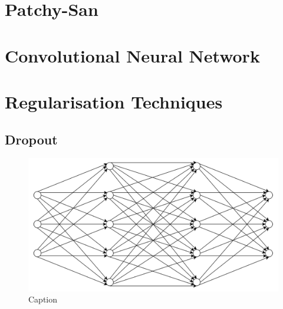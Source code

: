         
    \section{Patchy-San}
    
    \subsection{}
    
    \subsection{}
    
    \subsection{}
    
    \subsection{}
    
    \section{Convolutional Neural Network}
    
    \section{Regularisation Techniques}
    
    \subsection{Dropout}
    
    \begin{figure}[H]
        \centering
        \includegraphics[scale=0.45]{Images/beforedrp.png}
        \caption{Caption}
        \label{fig:my_label}
    \end{figure}
    
